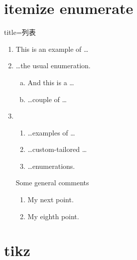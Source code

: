 \section{itemize enumerate}
\begin{tcblisting}{title=列表}
  \begin{enumerate}
  \item This is an example of \ldots
  \item \ldots the usual enumeration.
  \begin{enumerate}[a)]
    \item And this is a \ldots
    \item \ldots couple of \ldots
  \end{enumerate}
    \item 
    \begin{enumerate}[-- i --]
    \item \ldots examples of \ldots
    \item \ldots custom-tailored \ldots
    \item \ldots enumerations.
    \setcounter{enumii_saved}{\value{enumii}}
    \end{enumerate}
    Some general comments
    \begin{enumerate}[-- i --]
    \setcounter{enumii}{\value{enumii_saved}}
    \item My next point.
    \setcounter{enumii}{7}
    \item My eighth point.
    \end{enumerate}
  \end{enumerate}
\end{tcblisting}
\section{tikz}

